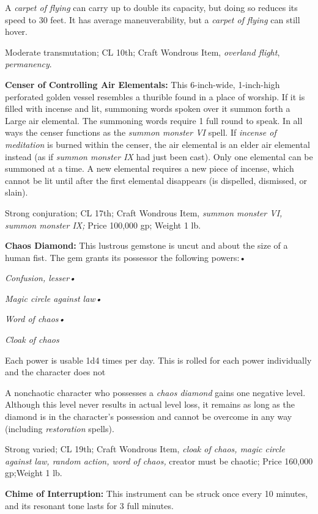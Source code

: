 \documentclass{article}
\begin{document}
A \textit{carpet of flying }can carry up to double its capacity, but doing so reduces 
its speed to 30 feet. It has average maneuverability, but a \textit{carpet of flying 
}can still hover.

Moderate transmutation; CL 10th; Craft Wondrous Item, \textit{overland flight}, 
\textit{permanency}.

\textbf{Censer of Controlling Air Elementals: }This 6-inch-wide, 1-inch-high perforated 
golden vessel resembles a thurible found in a place of worship. If it is filled 
with incense and lit, summoning words spoken over it summon forth a Large air elemental. 
The summoning words require 1 full round to speak. In all ways the censer functions 
as the \textit{summon monster VI }spell. If \textit{incense of meditation }is burned 
within the censer, the air elemental is an elder air elemental instead (as if \textit{summon 
monster IX }had just been cast). Only one elemental can be summoned at a time. 
A new elemental requires a new piece of incense, which cannot be lit until after 
the first elemental disappears (is dispelled, dismissed, or slain).

Strong conjuration; CL 17th; Craft Wondrous Item, \textit{summon monster VI, summon 
monster IX; }Price 100,000 gp; Weight 1 lb.

\textbf{Chaos Diamond:} This lustrous gemstone is uncut and about the size of a 
human fist. The gem grants its possessor the following powers:• 

\textit{Confusion, lesser• }

\textit{Magic circle against law• }

\textit{Word of chaos• }

\textit{Cloak of chaos}

Each power is usable 1d4 times per day. This is rolled for each power individually 
and the character does not 

A nonchaotic character who possesses a \textit{chaos diamond }gains one negative 
level. Although this level never results in actual level loss, it remains as long 
as the diamond is in the character's possession and cannot be overcome in any way 
(including \textit{restoration }spells).

Strong varied; CL 19th; Craft Wondrous Item, \textit{cloak of chaos, magic circle 
against law, random action, word of chaos, }creator must be chaotic; Price 160,000 
gp;Weight 1 lb.

\textbf{Chime of Interruption:} This instrument can be struck once every 10 minutes, 
and its resonant tone lasts for 3 full minutes.
\end{document}
